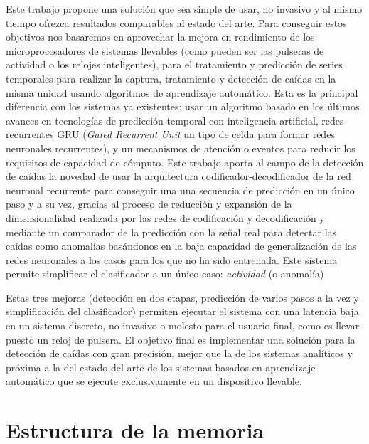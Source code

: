 Este trabajo propone una solución que sea simple de usar, no invasivo y al mismo tiempo ofrezca resultados comparables al estado del arte. Para conseguir estos objetivos nos basaremos en aprovechar la mejora en rendimiento de los microprocesadores de sistemas llevables (como pueden ser las pulseras de actividad o los relojes inteligentes), para el tratamiento y predicción de series temporales para realizar la captura, tratamiento y detección de caídas en la misma unidad usando algoritmos de aprendizaje automático. Esta es la principal diferencia con los sistemas ya existentes: usar un algoritmo basado en los últimos avances en tecnologías de predicción temporal con inteligencia artificial, redes recurrentes GRU (\textit{Gated Recurrent Unit} un tipo de celda para formar redes neuronales recurrentes),  y un mecanismos de atención o eventos para reducir los requisitos de capacidad de cómputo. Este trabajo aporta al campo de la detección de caídas la novedad de usar la arquitectura codificador-decodificador de la red neuronal recurrente para conseguir una una secuencia de predicción en un único paso y a su vez, gracias al proceso de reducción y expansión de la dimensionalidad realizada por las redes de codificación y decodificación y mediante un comparador de la predicción con la señal real para detectar las caídas como anomalías basándonos en la baja capacidad de generalización de las redes neuronales a los casos para los que no ha sido entrenada. Este sistema permite simplificar el clasificador a un único caso: \textit{actividad} (o anomalía)

Estas tres mejoras (detección en dos etapas, predicción de varios pasos a la vez y simplificación del clasificador) permiten ejecutar el sistema con una latencia baja en un sistema discreto, no invasivo o molesto para el usuario final, como es llevar puesto un reloj de pulsera. El objetivo final es implementar una solución para la detección de caídas con gran precisión, mejor que la de los sistemas analíticos y próxima a la del estado del arte de los sistemas basados en aprendizaje automático que se ejecute exclusivamente en un dispositivo llevable.

\section{Estructura de la memoria}\label{seq:intro:estructura}
\begin{comment}
qué hay en cada uno de los subsiguientes capítulos
\end{comment}

